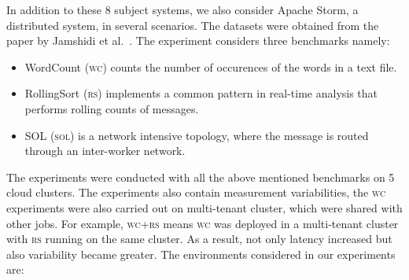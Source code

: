 \documentclass[sigconf]{acmart}
\begin{document}
In addition to these 8 subject systems, we also consider Apache Storm, a distributed system, in several scenarios. The datasets were obtained from the paper by Jamshidi et al.~\cite{jamshidi2016uncertainty}. The experiment considers three  benchmarks namely:
\begin{itemize}
    \item WordCount (\textsc{wc}) counts the number of occurences of the words in a text file. 
    \item RollingSort (\textsc{rs}) implements a common pattern in real-time analysis that performs rolling counts of messages. 
    \item SOL (\textsc{sol}) is a network intensive topology, where the message is routed through an inter-worker network.
\end{itemize}
The experiments were conducted with all the above mentioned benchmarks on 5 cloud clusters. The experiments also contain measurement variabilities, the \textsc{wc} experiments were also carried out on multi-tenant cluster, which were shared with other jobs. For example, \textsc{wc}+\textsc{rs} means \textsc{wc} was deployed in a multi-tenant cluster with \textsc{rs} running on the same cluster. As a result, not only latency increased but also variability became greater. The environments considered in our experiments are:
\end{document}
